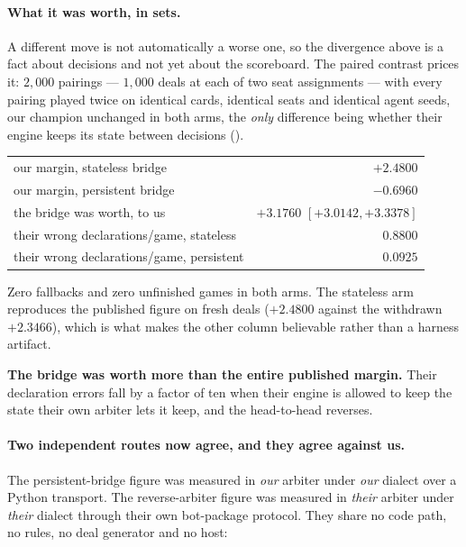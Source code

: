 \documentclass[11pt,letterpaper]{article}
\begin{document}
\paragraph{What it was worth, in sets.} A different move is not automatically a
worse one, so the divergence above is a fact about decisions and not yet about
the scoreboard. The paired contrast prices it: $2{,}000$ pairings --- $1{,}000$ deals
at each of two seat assignments --- with every pairing played twice on
identical cards, identical seats and identical agent seeds, our champion
unchanged in both arms, the \emph{only} difference being whether their engine
keeps its state between decisions
().

\begin{center}
\small
\begin{tabular}{lr}
\toprule
our margin, stateless bridge & $+2.4800$ \\
our margin, persistent bridge & $\mathbf{-0.6960}$ \\
\midrule
the bridge was worth, to us & $\mathbf{+3.1760}$ $[+3.0142, +3.3378]$ \\
\midrule
their wrong declarations/game, stateless & $0.8800$ \\
their wrong declarations/game, persistent & $\mathbf{0.0925}$ \\
\bottomrule
\end{tabular}
\end{center}

\noindent Zero fallbacks and zero unfinished games in both arms. The stateless
arm reproduces the published figure on fresh deals ($+2.4800$ against
the withdrawn $+2.3466$), which is what makes the other column believable rather than a
harness artifact.

\textbf{The bridge was worth more than the entire published margin.} Their
declaration errors fall by a factor of ten when their engine is allowed to keep
the state their own arbiter lets it keep, and the head-to-head reverses.

\paragraph{Two independent routes now agree, and they agree against us.} The
persistent-bridge figure was measured in \emph{our} arbiter under \emph{our}
dialect over a Python transport. The reverse-arbiter figure was measured in
\emph{their} arbiter under \emph{their} dialect through their own bot-package
protocol. They share no code path, no rules, no deal generator and no host:
\end{document}
